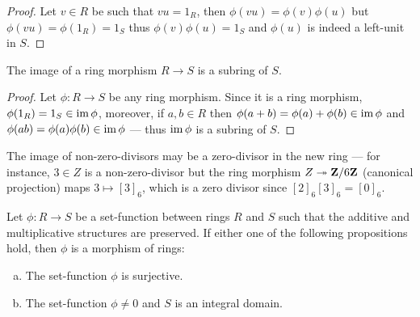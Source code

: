%
\begin{proof}
Let \(v \in R\) be such that \(v u = 1_R\), then \(\phi(v u) = \phi(v) \phi(u)\)
but \(\phi(v u) = \phi(1_R) = 1_S\) thus \(\phi(v) \phi(u) = 1_S\) and
\(\phi(u)\) is indeed a left-unit in \(S\).
\end{proof}
%

%
\begin{proposition}
\label{prop:image-of-morphism-is-subring}
The image of a ring morphism \(R \to S\) is a subring of \(S\).
\end{proposition}
%

%
\begin{proof}
Let \(\phi: R \to S\) be any ring morphism. Since it is a ring morphism,
\(\phi(1_R) = 1_S \in \operatorname{im} \phi\), moreover, if \(a, b \in R\) then \(\phi(a + b)
= \phi(a) + \phi(b) \in \operatorname{im} \phi\) and \(\phi(a b) = \phi(a) \phi(b) \in \operatorname{im}
\phi\) --- thus \(\operatorname{im} \phi\) is a subring of \(S\).
\end{proof}
%

%
\begin{remark}
\label{rem:non-zero-divisors-may-not-be-preserved}
The image of non-zero-divisors may be a zero-divisor in the new ring --- for
instance, \(3 \in Z\) is a non-zero-divisor but the ring morphism
\(Z \twoheadrightarrow \mathbf{Z}/6\mathbf{Z}\) (canonical projection) maps \(3 \mapsto [3]_6\), which is a
zero divisor since \([2]_6 [3]_6 = [0]_6\).
\end{remark}
%

%
\begin{proposition}
\label{prop:sufficient-conditions-morphism-of-rings}
Let \(\phi: R \to S\) be a set-function between rings \(R\) and \(S\) such that
the additive and multiplicative structures are preserved. If either one of the
following propositions hold, then \(\phi\) is a morphism of rings:
\begin{enumerate}[(a)]\setlength\itemsep{0em}
\item The set-function \(\phi\) is surjective.

\item The set-function \(\phi \neq 0\) and \(S\) is an integral domain.
\end{enumerate}
\end{proposition}
%

